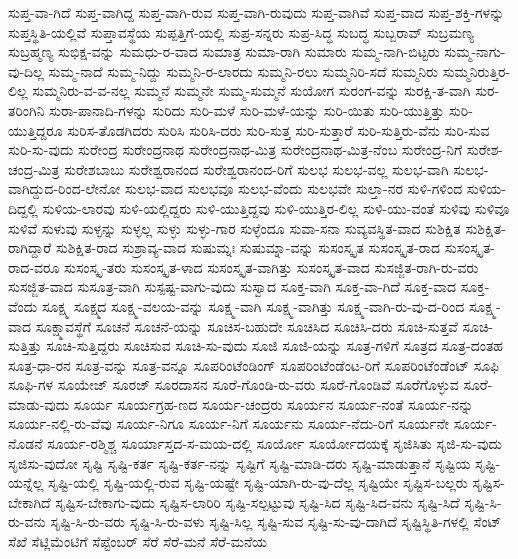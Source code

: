 {ಸುಪ್ತ-ವಾ-ಗಿದೆ
ಸುಪ್ತ-ವಾಗಿದ್ದ
ಸುಪ್ತ-ವಾಗಿ-ರುವ
ಸುಪ್ತ-ವಾಗಿ-ರುವುದು
ಸುಪ್ತ-ವಾಗಿವೆ
ಸುಪ್ತ-ವಾದ
ಸುಪ್ತ-ಶಕ್ತಿ-ಗಳನ್ನು
ಸುಪ್ತಸ್ಥಿತಿ-ಯಲ್ಲಿವೆ
ಸುಪ್ತಾವಸ್ಥೆಯ
ಸುಪ್ಪತ್ತಿಗೆ-ಯಲ್ಲಿ
ಸುಪ್ರ-ಸನ್ನರು
ಸುಪ್ರ-ಸಿದ್ಧ
ಸುಬದ್ಧ
ಸುಬ್ಬರಾವ್
ಸುಬ್ರಮಣ್ಯ
ಸುಬ್ರಹ್ಮಣ್ಯ
ಸುಭಿಕ್ಷ-ವನ್ನು
ಸುಮಧು-ರ-ವಾದ
ಸುಮಾತ್ರ
ಸುಮಾ-ರಾಗಿ
ಸುಮಾರು
ಸುಮ್ಮ-ನಾಗಿ-ಬಿಟ್ಟರು
ಸುಮ್ಮ-ನಾಗು-ವು-ದಿಲ್ಲ
ಸುಮ್ಮ-ನಾದೆ
ಸುಮ್ಮ-ನಿದ್ದು
ಸುಮ್ಮನಿ-ರ-ಲಾರದು
ಸುಮ್ಮನಿ-ರಲು
ಸುಮ್ಮನಿರಿ-ಸದೆ
ಸುಮ್ಮನಿರು
ಸುಮ್ಮನಿರುತ್ತಿರ-ಲಿಲ್ಲ
ಸುಮ್ಮನಿರು-ವ-ವ-ನಲ್ಲ
ಸುಮ್ಮನೆ
ಸುಮ್ಮನೇ
ಸುಮ್ಮ-ಸುಮ್ಮನೆ
ಸುಯೋಗ
ಸುರಂಗ-ವನ್ನು
ಸುರಕ್ಷಿ-ತ-ವಾಗಿ
ಸುರ-ತರಿಂಗಿನಿ
ಸುರಾ-ಪಾನಾದಿ-ಗಳನ್ನು
ಸುರಿದು
ಸುರಿ-ಮಳೆ
ಸುರಿ-ಮಳೆ-ಯನ್ನು
ಸುರಿ-ಯಿತು
ಸುರಿ-ಯುತ್ತಿತ್ತು
ಸುರಿ-ಯುತ್ತಿದ್ದರೂ
ಸುರಿಸ-ತೊಡಗಿದರು
ಸುರಿಸಿ
ಸುರಿಸಿ-ದರು
ಸುರಿ-ಸುತ್ತ
ಸುರಿ-ಸುತ್ತಾರೆ
ಸುರಿ-ಸುತ್ತಿರು-ವೆನು
ಸುರಿ-ಸುವ
ಸುರಿ-ಸು-ವುದು
ಸುರೇಂದ್ರ
ಸುರೇಂದ್ರನಾಥ
ಸುರೇಂದ್ರನಾಥ-ಮಿತ್ರ
ಸುರೇಂದ್ರನಾಥ-ಮಿತ್ರ-ನೆಂಬ
ಸುರೇಂದ್ರ-ನಿಗೆ
ಸುರೇಶ-ಚಂದ್ರ-ಮಿತ್ರ
ಸುರೇಶಬಾಬು
ಸುರೇಶ್ವರಾನಂದ
ಸುರೇಶ್ವರಾನಂದ-ರಿಗೆ
ಸುಲಭ
ಸುಲಭ-ವಲ್ಲ
ಸುಲಭ-ವಾಗಿ
ಸುಲಭ-ವಾಗಿದ್ದುದ-ರಿಂದ-ಲೇನೋ
ಸುಲಭ-ವಾದ
ಸುಲಭವೂ
ಸುಲಭ-ವೆಂದು
ಸುಲಭವೇ
ಸುಲ್ತಾ-ನರ
ಸುಳಿ-ಗಳಿಂದ
ಸುಳಿಯ-ದಿದ್ದಲ್ಲಿ
ಸುಳಿಯ-ಲಾರವು
ಸುಳಿ-ಯಲ್ಲಿದ್ದರು
ಸುಳಿ-ಯುತ್ತಿದ್ದವು
ಸುಳಿ-ಯುತ್ತಿರ-ಲಿಲ್ಲ
ಸುಳಿ-ಯು-ವಂತೆ
ಸುಳಿವು
ಸುಳಿವೂ
ಸುಳಿವೆ
ಸುಳುವು
ಸುಳ್ಳನ್ನು
ಸುಳ್ಳಲ್ಲ
ಸುಳ್ಳು
ಸುಳ್ಳು-ಗಾರ
ಸುಳ್ಳೆಂದೂ
ಸುವಾ-ಸನಾ
ಸುವ್ಯವಸ್ಥಿತ-ವಾದ
ಸುಶಿಕ್ಷಿತ
ಸುಶಿಕ್ಷಿತ-ರಾಗಿದ್ದಾರೆ
ಸುಶಿಕ್ಷಿತ-ರಾದ
ಸುಶ್ರಾವ್ಯ-ವಾದ
ಸುಷುಮ್ನಃ
ಸುಷುಮ್ನಾ-ವನ್ನು
ಸುಸಂಸ್ಕೃತ
ಸುಸಂಸ್ಕೃತ-ರಾದ
ಸುಸಂಸ್ಕೃತ-ರಾದ-ವರೂ
ಸುಸಂಸ್ಕೃ-ತರು
ಸುಸಂಸ್ಕೃತ-ಳಾದ
ಸುಸಂಸ್ಕೃತ-ವಾಗಿತ್ತು
ಸುಸಂಸ್ಕೃತ-ವಾದ
ಸುಸಜ್ಜಿತ-ರಾಗಿ-ರು-ವರು
ಸುಸಜ್ಜಿತ-ವಾದ
ಸುಸೂತ್ರ-ವಾಗಿ
ಸುಸ್ಪಷ್ಟ-ವಾಗು-ವುದು
ಸುಸ್ವಾದ
ಸೂಕ್ತ-ವಾಗಿ
ಸೂಕ್ತ-ವಾ-ಗಿದೆ
ಸೂಕ್ತ-ವಾದ
ಸೂಕ್ತ-ವೆಂದು
ಸೂಕ್ಷ್ಮ
ಸೂಕ್ಷ್ಮದ
ಸೂಕ್ಷ್ಮ-ವಲಯ-ವನ್ನು
ಸೂಕ್ಷ್ಮ-ವಾಗಿ
ಸೂಕ್ಷ್ಮ-ವಾಗಿತ್ತು
ಸೂಕ್ಷ್ಮ-ವಾಗಿ-ರು-ವು-ದ-ರಿಂದ
ಸೂಕ್ಷ್ಮ-ವಾದ
ಸೂಕ್ಷ್ಮಾವಸ್ಥೆಗೆ
ಸೂಚನೆ
ಸೂಚನೆ-ಯನ್ನು
ಸೂಚಿಸ-ಬಹುದೇ
ಸೂಚಿಸಿದ
ಸೂಚಿಸಿ-ದರು
ಸೂಚಿ-ಸುತ್ತವೆ
ಸೂಚಿ-ಸುತ್ತಿತ್ತು
ಸೂಚಿ-ಸುತ್ತಿದ್ದರು
ಸೂಚಿಸುವ
ಸೂಚಿ-ಸು-ವುದು
ಸೂಜಿ
ಸೂಜಿ-ಯನ್ನು
ಸೂತ್ರ-ಗಳಿಗೆ
ಸೂತ್ರದ
ಸೂತ್ರ-ದಂತಹ
ಸೂತ್ರ-ಧಾ-ರನ
ಸೂತ್ರ-ವನ್ನು
ಸೂತ್ರ-ವನ್ನೂ
ಸೂಪರಿಂಟೆಂಡಿಂಗ್
ಸೂಪರಿಂಟೆಂಡೆಂಟ-ರಿಗೆ
ಸೂಪರಿಂಟೆಂಡೆಂಟ್
ಸೂಫಿ
ಸೂಫಿ-ಗಳ
ಸೂಯೇಜ್
ಸೂರಜ್
ಸೂರದಾಸನ
ಸೂರೆ-ಗೊಂಡಿ-ರು-ವರು
ಸೂರೆ-ಗೊಂಡಿವೆ
ಸೂರೆಗೊಳ್ಳುವ
ಸೂರೆ-ಮಾಡು-ವುದು
ಸೂರ್ಯ
ಸೂರ್ಯಗ್ರಹ-ಣದ
ಸೂರ್ಯ-ಚಂದ್ರರು
ಸೂರ್ಯನ
ಸೂರ್ಯ-ನಂತೆ
ಸೂರ್ಯ-ನನ್ನು
ಸೂರ್ಯ-ನಲ್ಲಿ-ರು-ವೆವು
ಸೂರ್ಯ-ನಿಗೂ
ಸೂರ್ಯ-ನಿಗೆ
ಸೂರ್ಯನು
ಸೂರ್ಯ-ನೆದು-ರಿಗೆ
ಸೂರ್ಯನೇ
ಸೂರ್ಯ-ನೊಡನೆ
ಸೂರ್ಯ-ರಶ್ಮಿಶ್ಚ
ಸೂರ್ಯಾಸ್ತದ-ಸ-ಮಯ-ದಲ್ಲಿ
ಸೂರ್ಯೋ
ಸೂರ್ಯೋದಯಕ್ಕೆ
ಸೃಜಿಸಿತು
ಸೃಜಿ-ಸು-ವುದು
ಸೃಜಿಸು-ವುದೋ
ಸೃಷ್ಟಿ
ಸೃಷ್ಟಿ-ಕರ್ತ
ಸೃಷ್ಟಿ-ಕರ್ತ-ನನ್ನು
ಸೃಷ್ಟಿಗೆ
ಸೃಷ್ಟಿ-ಮಾಡಿ-ದರು
ಸೃಷ್ಟಿ-ಮಾಡುತ್ತಾನೆ
ಸೃಷ್ಟಿಯ
ಸೃಷ್ಟಿ-ಯನ್ನೆಲ್ಲ
ಸೃಷ್ಟಿ-ಯಲ್ಲಿ
ಸೃಷ್ಟಿ-ಯಲ್ಲಿ-ರುವ
ಸೃಷ್ಟಿ-ಯಷ್ಟೇ
ಸೃಷ್ಟಿ-ಯಾಗಿ-ರು-ವು-ದೆಲ್ಲ
ಸೃಷ್ಟಿಯೇ
ಸೃಷ್ಟಿಸ-ಬಲ್ಲರು
ಸೃಷ್ಟಿಸ-ಬೇಕಾಗಿದೆ
ಸೃಷ್ಟಿಸ-ಬೇಕಾಗು-ವುದು
ಸೃಷ್ಟಿಸ-ಲಾರಿರಿ
ಸೃಷ್ಟಿ-ಸಲ್ಪಟ್ಟುವು
ಸೃಷ್ಟಿ-ಸಿದ
ಸೃಷ್ಟಿ-ಸಿದ-ವನು
ಸೃಷ್ಟಿ-ಸಿದೆ
ಸೃಷ್ಟಿ-ಸಿ-ರು-ವನು
ಸೃಷ್ಟಿ-ಸಿ-ರು-ವರು
ಸೃಷ್ಟಿ-ಸಿ-ರು-ವಳು
ಸೃಷ್ಟಿ-ಸಿಲ್ಲ
ಸೃಷ್ಟಿ-ಸುವ
ಸೃಷ್ಟಿ-ಸು-ವು-ದಾಗಿದೆ
ಸೃಷ್ಟಿಸ್ಥಿತಿ-ಗಳಲ್ಲಿ
ಸೆಂಟ್
ಸೆಖೆ
ಸೆಟ್ಲಿಮೆಂಟಿಗೆ
ಸೆಪ್ಟೆಂಬರ್
ಸೆರೆ
ಸೆರೆ-ಮನೆ
ಸೆರೆ-ಮನೆಯ
}
